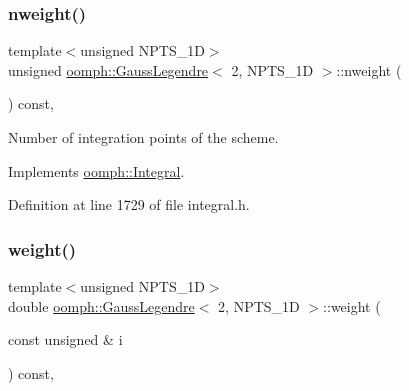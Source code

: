 \mbox{\label{classoomph_1_1GaussLegendre_3_012_00_01NPTS__1D_01_4_a5d7decc01653676a3a0a8c967bf17f9f}} 
\subsubsection{\texorpdfstring{nweight()}{nweight()}}
{\footnotesize\ttfamily template$<$unsigned N\+P\+T\+S\+\_\+1D$>$ \\
unsigned \hyperlink{classoomph_1_1GaussLegendre}{oomph\+::\+Gauss\+Legendre}$<$ 2, N\+P\+T\+S\+\_\+1D $>$\+::nweight (\begin{DoxyParamCaption}{ }\end{DoxyParamCaption}) const\hspace{0.3cm}{\ttfamily [inline]}, {\ttfamily [virtual]}}



Number of integration points of the scheme. 



Implements \hyperlink{classoomph_1_1Integral_a1a270de9d99a1fcf1d25a6c1017f65fa}{oomph\+::\+Integral}.



Definition at line 1729 of file integral.\+h.

\mbox{\label{classoomph_1_1GaussLegendre_3_012_00_01NPTS__1D_01_4_a6029854a1a1a55ff0d4ac37f936cdbb6}} 
\subsubsection{\texorpdfstring{weight()}{weight()}}
{\footnotesize\ttfamily template$<$unsigned N\+P\+T\+S\+\_\+1D$>$ \\
double \hyperlink{classoomph_1_1GaussLegendre}{oomph\+::\+Gauss\+Legendre}$<$ 2, N\+P\+T\+S\+\_\+1D $>$\+::weight (\begin{DoxyParamCaption}\item[{const unsigned \&}]{i }\end{DoxyParamCaption}) const\hspace{0.3cm}{\ttfamily [inline]}, {\ttfamily [virtual]}}



